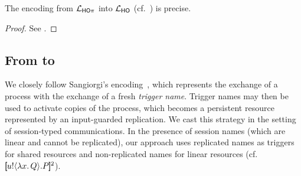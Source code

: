 \documentclass[runningheads]{llncs}
\begin{document}
{{\begin{theorem}
\label{f:enc:hopitoho}
The encoding from $\mathcal{L}_{\mathsf{HO}\pi}$ into $\mathcal{L}_{\mathsf{HO}}$ (cf.~)
is precise. 
\end{theorem}

\begin{proof}
See .
\end{proof}

\subsection{From \HOp to \sessp}
\label{subsec:HOp_to_sessp}
We closely follow Sangiorgi's encoding~\cite{San92,SaWabook}, which represents 
the exchange of a process with the exchange of a fresh \emph{trigger name}. 
Trigger names may then be used to activate copies of the process, which becomes a persistent resource represented by an input-guarded replication.
We cast this strategy in the setting of session-typed communications. 
In the presence of session names (which are linear  and cannot be replicated),
our
approach %
 uses replicated names
as triggers for shared resources and non-replicated names
for linear resources (cf. $[\!\![u ! \langle \lambda x.\,Q \rangle . P]\!\!]^2$).

}}
\end{document}

